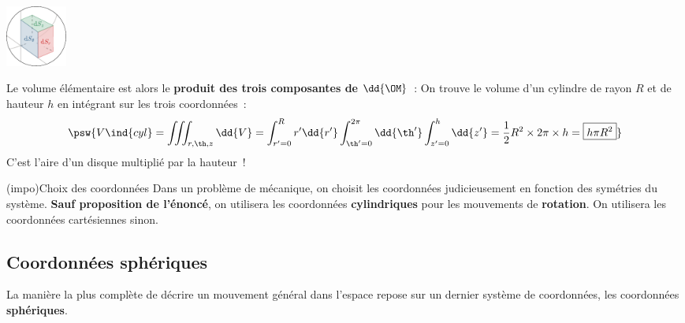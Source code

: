 \documentclass[../../main/main.tex]{subfiles}
\begin{document}
\begin{tcb}
\begin{isd}
\begin{minipage}{0.49\linewidth}
\begin{center}
			\end{center}
			\begin{center}
				\includegraphics[height=2cm]{zoom_cyl_sfc}
				\captionsetup{justification=centering}
			\end{center}
		\end{minipage}
	\end{isd}
	Le volume élémentaire est alors le \textbf{produit des trois composantes de}
	$\dd{\OM}$~:
	\psw{%
		\[
			\boxed{\dd{V} = r \dd{r} \dd{\th} \dd{z}}
		\]
	}%
	On trouve le volume d'un cylindre de rayon $R$ et de hauteur $h$ en
	intégrant sur les trois coordonnées~:
	\[
		\psw{%
			V\ind{cyl} = \iiint_{r,\th,z} \dd{V} =
			\int_{r'=0}^{R} r'\dd{r'}
			\int_{\th'=0}^{2\pi} \dd{\th'}
			\int_{z'=0}^{h} \dd{z'} =
			\frac{1}{2}R^2\times 2\pi \times h = \boxed{h\pi R^2}
		}%
	\]
	C'est l'aire d'un disque multiplié par la hauteur~!
\end{tcb}

\begin{tcb*}(impo){Choix des coordonnées}
	Dans un problème de mécanique, on choisit les coordonnées judicieusement en
	fonction des symétries du système. \textbf{Sauf proposition de l'énoncé}, on
	utilisera les coordonnées \textbf{cylindriques} pour les mouvements de
	\textbf{rotation}. On utilisera les coordonnées cartésiennes sinon.
\end{tcb*}

\subsection{Coordonnées sphériques}
La manière la plus complète de décrire un mouvement général dans l'espace repose
sur un dernier système de coordonnées, les coordonnées \textbf{sphériques}.
\end{document}
